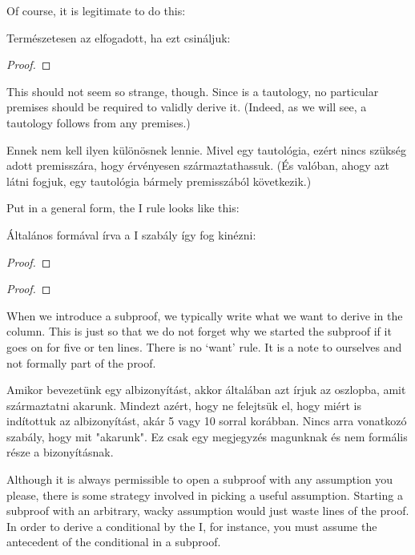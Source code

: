 Of course, it is legitimate to do this:

Természetesen az  elfogadott, ha ezt csináljuk:

\begin{proof}
	\open
		 
	\close
	 
\end{proof}

This should not seem so strange, though. Since \eif{} is a tautology, no particular premises should be required to validly derive it. (Indeed, as we will see, a tautology follows from any premises.)

Ennek nem kell ilyen különösnek lennie. Mivel \eif{} egy tautológia, ezért nincs szükség adott premisszára, hogy érvényesen származtathassuk. (És valóban, ahogy azt látni fogjuk, egy tautológia bármely premisszából következik.)

Put in a general form, the {\eif}I rule looks like this:

Általános formával írva a {\eif}I szabály így fog kinézni:

\begin{proof}
	\open
		 
	\close
\end{proof}

\begin{proof}
	\open
		 
	\close
\end{proof}

When we introduce a subproof, we typically write what we want to derive in the column. This is just so that we do not forget why we started the subproof if it goes on for five or ten lines. There is no `want' rule. It is a note to ourselves and not formally part of the proof.

Amikor bevezetünk egy albizonyítást, akkor általában azt írjuk az oszlopba, amit származtatni akarunk. Mindezt azért, hogy ne felejtsük el, hogy miért is indítottuk az albizonyítást, akár 5 vagy 10 sorral korábban. Nincs arra vonatkozó szabály, hogy mit "akarunk". Ez csak egy megjegyzés magunknak és nem formális része a bizonyításnak.

Although it is always permissible to open a subproof with any assumption you please, there is some strategy involved in picking a useful assumption. Starting a subproof with an arbitrary, wacky assumption would just waste lines of the proof. In order to derive a conditional by the {\eif}I, for instance, you must assume the antecedent of the conditional in a subproof.

